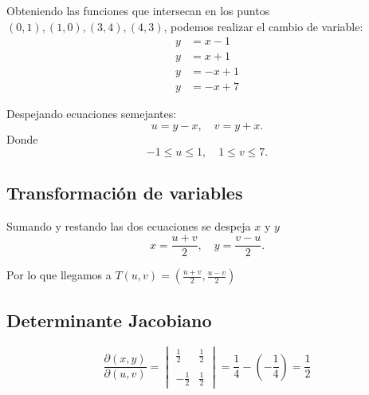     \begin{center}
    \end{center}

    Obteniendo las funciones que intersecan en los puntos $(0,1),(1,0),(3,4),(4,3)$, podemos realizar el cambio de variable:
    \begin{align}
        y &= x - 1 \\
        y &= x + 1 \\
        y &= -x + 1 \\
        y &= -x + 7
    \end{align}

    Despejando ecuaciones semejantes:
    \[
        u = y - x, \quad v = y + x.
    \]    
    Donde 
    \[
        -1\leq u \leq 1, \quad 1 \leq v \leq 7.
    \]

    \subsection*{Transformación de variables}
    Sumando y restando las dos ecuaciones se despeja $x$ y $y$
    \[
        x = \frac{u + v}{2}, \quad y = \frac{v - u}{2}.
    \]

    \vspace{10pt}
    Por lo que llegamos a $T(u,v) = (\frac{u + v}{2},\frac{u - v}{2})$

    \subsection*{Determinante Jacobiano}
    \[
    \frac{\partial(x, y)}{\partial(u, v)}  =  \begin{vmatrix} 
        \frac{1}{2} & \frac{1}{2} \\ \\ 
        -\frac{1}{2} & \frac{1}{2} 
    \end{vmatrix} = \frac{1}{4} - \left(-\frac{1}{4}\right) = \frac{1}{2}
    \]

